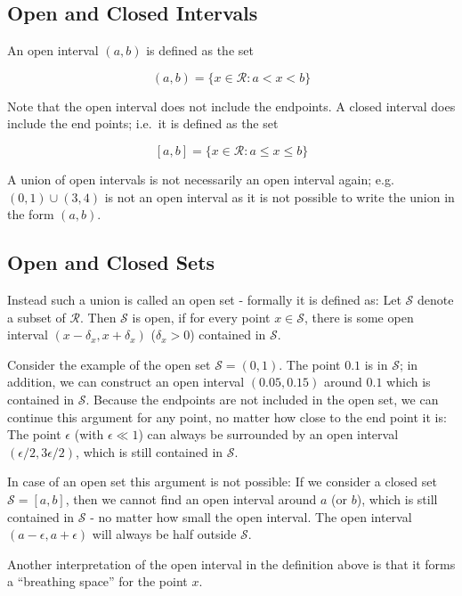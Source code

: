 
\subsection{Open and Closed Intervals}

An open interval \((a,b)\) is defined as the set

\[
(a,b) = \{ x \in \mathcal{R}: a < x < b \}
\]

Note that the open interval does not include the endpoints. A closed
interval does include the end points; i.e.~it is defined as the set

\[
[a,b] = \{ x \in \mathcal{R}: a \leq x \leq b \}
\]

A union of open intervals is not necessarily an open interval again;
e.g. \((0,1) \cup (3,4)\) is not an open interval as it is not possible
to write the union in the form \((a,b)\).

\subsection{Open and Closed Sets}

Instead such a union is called an open set - formally it is defined as:
Let \(\mathcal{S}\) denote a subset of \(\mathcal{R}\). Then
\(\mathcal{S}\) is open, if for every point \(x \in \mathcal{S}\), there
is some open interval \((x-\delta_x, x + \delta_x)\) (\(\delta_x > 0\))
contained in \(\mathcal{S}\).

Consider the example of the open set \(\mathcal{S} = (0,1)\). The point
\(0.1\) is in \(\mathcal{S}\); in addition, we can construct an open
interval \((0.05, 0.15)\) around \(0.1\) which is contained in
\(\mathcal{S}\). Because the endpoints are not included in the open set,
we can continue this argument for any point, no matter how close to the
end point it is: The point \(\epsilon\) (with \(\epsilon \ll 1\)) can
always be surrounded by an open interval \((\epsilon/2, 3\epsilon/2)\),
which is still contained in \(\mathcal{S}\).

In case of an open set this argument is not possible: If we consider a
closed set \(\mathcal{S} = [a,b]\), then we cannot find an open interval
around \(a\) (or \(b\)), which is still contained in \(\mathcal{S}\) -
no matter how small the open interval. The open interval
\((a-\epsilon, a+\epsilon)\) will always be half outside
\(\mathcal{S}\).

Another interpretation of the open interval in the definition above is
that it forms a ``breathing space'' for the point \(x\).

